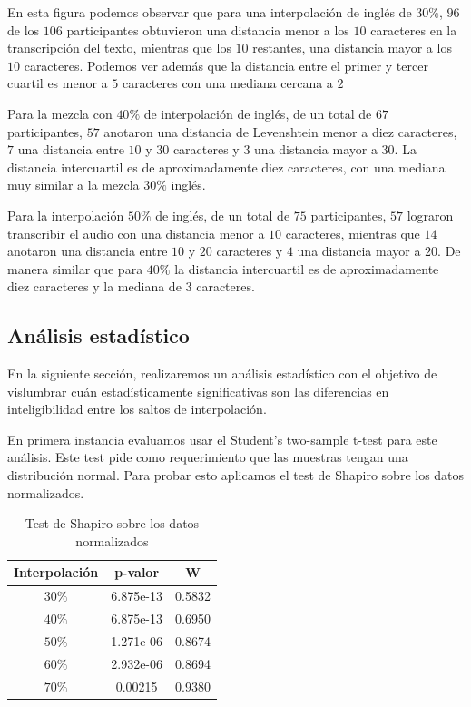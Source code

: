 En esta figura podemos observar que para una interpolación de inglés de $30\%$, $96$ de los $106$ participantes obtuvieron una distancia menor a los $10$ caracteres en la transcripción del texto, mientras que los $10$ restantes, una distancia mayor a los $10$ caracteres. Podemos ver además que la distancia entre el primer y tercer cuartil es menor a $5$ caracteres con una mediana cercana a $2$ 

Para la mezcla con $40\%$ de interpolación de inglés, de un total de $67$ participantes, $57$ anotaron una distancia de Levenshtein menor a diez caracteres, $7$ una distancia entre $10$ y $30$ caracteres y $3$ una distancia mayor a $30$. La distancia intercuartil es de aproximadamente diez caracteres, con una mediana muy similar a la mezcla $30\%$ inglés.

Para la interpolación $50\%$ de inglés, de un total de $75$ participantes, $57$ lograron transcribir el audio con una distancia menor a $10$ caracteres, mientras que $14$ anotaron una distancia entre $10$ y $20$ caracteres y $4$ una distancia mayor a $20$. De manera similar que para $40\%$ la distancia intercuartil es de aproximadamente diez caracteres y la mediana de $3$ caracteres.

\subsection{Análisis estadístico}

En la siguiente sección, realizaremos un análisis estadístico con el objetivo de vislumbrar cuán estadísticamente significativas son las diferencias en inteligibilidad entre los saltos de interpolación.

En primera instancia evaluamos usar el Student's two-sample t-test para este análisis. Este test pide como requerimiento que las muestras tengan una distribución normal. Para probar esto aplicamos el test de Shapiro sobre los datos normalizados.

\begin{table}
\centering
\begin{tabular}[t]{| c | c | c |}
\hline
Interpolación & p-valor & W \\
\hline
\hline
$30\%$ & 6.875e-13 & 0.5832 \\
\hline
$40\%$ & 6.875e-13 & 0.6950 \\
\hline
$50\%$ & 1.271e-06 & 0.8674 \\
\hline
$60\%$ & 2.932e-06 & 0.8694 \\
\hline
$70\%$ & 0.00215 & 0.9380\\

\hline
\end{tabular}
\caption{Test de Shapiro sobre los datos normalizados} 
\label{fig:resultadosShapiro}
\end{table}

